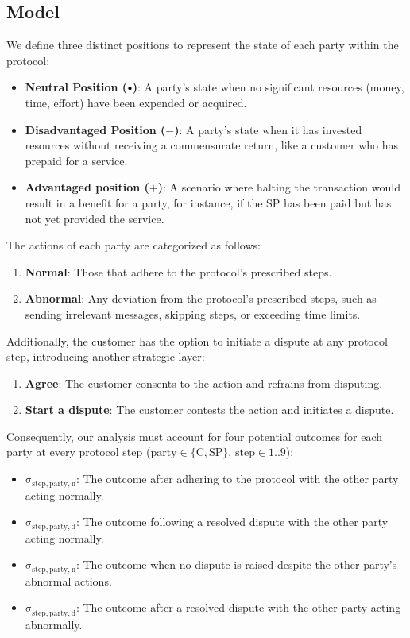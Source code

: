 \documentclass[pdftex,twocolumn,epjc3]{svjour3}
\newcommand{\plus}{+}
\newcommand{\minus}{-}
\newcommand\neutral[1][.75]{\mathbin{\ThisStyle{\vcenter{\hbox{%
  \scalebox{#1}{$\SavedStyle\bullet$}}}}}%
}
\begin{document}
{\subsection{Model}\label{sec:fairness-model}
We define three distinct positions to represent the state of each party within the protocol:


\begin{itemize}
\item \textbf{Neutral Position ($\neutral{}$)}: A party's state when no significant resources (money, time, effort) have been expended or acquired.
\item \textbf{Disadvantaged Position ($\minus{}$)}: A party's state when it has invested resources without receiving a commensurate return, like a customer who has prepaid for a service.
\item \textbf{Advantaged position ($\plus{}$)}: A scenario where halting the transaction would result in a benefit for a party, for instance, if the SP has been paid but has not yet provided the service.
\end{itemize}

The actions of each party are categorized as follows:

\begin{enumerate}
\item \textbf{Normal}: Those that adhere to the protocol's prescribed steps.
\item \textbf{Abnormal}: Any deviation from the protocol's prescribed steps, such as sending irrelevant messages, skipping steps, or exceeding time limits.
\end{enumerate}

Additionally, the customer has the option to initiate a dispute at any protocol step, introducing another strategic layer:

\begin{enumerate}
\def\labelenumi{\arabic{enumi}.}
\item \textbf{Agree}: The customer consents to the action and refrains from disputing.
\item \textbf{Start a dispute}: The customer contests the action and initiates a dispute.
\end{enumerate}

Consequently, our analysis must account for four potential outcomes for each party at every protocol step ($\mathrm{party \in \{C, SP}\}$, $\mathrm{step \in 1..9}$):

\begin{itemize}
\item $\mathrm{\sigma_{step,party,n}}$: The outcome after adhering to the protocol with the other party acting normally.
\item $\mathrm{\sigma_{step,party,d}}$: The outcome following a resolved dispute with the other party acting normally.
\item $\mathrm{\sigma_{step,party,\overline{n}}}$: The outcome when no dispute is raised despite the other party's abnormal actions.
\item $\mathrm{\sigma_{step,party,\overline{d}}}$: The outcome after a resolved dispute with the other party acting abnormally.
\end{itemize}

}
\end{document}
